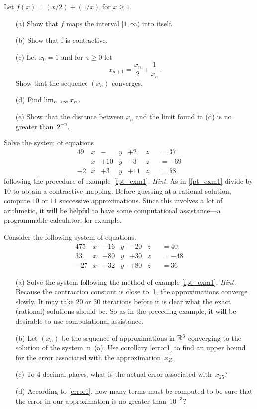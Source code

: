 \begin{prob} Let $f(x) = (x/2) + (1/x)$ for $x \ge 1$.
 \begin{enumerate}
  \item[(a)] Show that $f$ maps the interval $[1,\infty)$ into itself.
  \item[(b)] Show that f is contractive.
  \item[(c)] Let $x_0 = 1$ and for $n \ge 0$ let
   \[ x_{n+1} = \frac{x_n}2 + \frac1{x_n}\,. \]
Show that the sequence $(x_n)$ converges.
  \item[(d)] Find $\lim_{n \rightarrow \infty}x_n$.
  \item[(e)] Show that the distance between $x_n$ and the limit found in (d) is no greater
than~$2^{-n}$.
 \end{enumerate}
\end{prob}

\begin{prob} Solve the system of equations
  \begin{alignat*}{4}
         9&x  &   -&y  &  + 2&z &&= 37 \\
          &x  & +10&y  &  - 3&z &&= -69 \\
        -2&x  &  +3&y  &  +11&z &&= 58
  \end{alignat*}
following the procedure of example~\ref{fpt_exm1}.  \emph{Hint.} As in \ref{fpt_exm1} divide by
$10$ to obtain a contractive mapping. Before guessing at a rational solution, compute $10$ or $11$
successive approximations.  Since this involves a lot of arithmetic, it will be helpful to have
some computational assistance---a programmable calculator, for example.
\end{prob}

\begin{prob} Consider the following system of equations.
  \begin{alignat*}{4}
         75&x  & +16&y  &   -20&z &&= 40 \\
         33&x  & +80&y  &   +30&z &&= -48 \\
        -27&x  & +32&y  &   +80&z &&= 36
  \end{alignat*}
 \begin{enumerate}
  \item[(a)] Solve the system following the method of example \ref{fpt_exm1}.  \emph{Hint.} Because
the contraction constant is close to~1, the approximations converge slowly. It may take 20 or 30
iterations before it is clear what the exact (rational) solutions should be.  So as in the
preceding example, it will be desirable to use computational assistance.
  \item[(b)] Let $(x_n)$ be the sequence of approximations in $\mathbb{R}^3$ converging to the solution of
the system in~(a).  Use corollary \ref{error1} to find an upper bound for the error associated with
the approximation~$x_{25}$.
  \item[(c)] To 4 decimal places, what is the actual error associated with~$x_{25}$?
  \item[(d)] According to \ref{error1}, how many terms must be computed to be sure that the error
in our approximation is no greater than~$10^{-3}$?
 \end{enumerate}
\end{prob}

